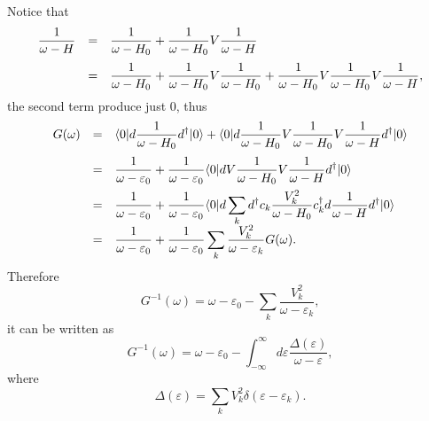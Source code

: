 \documentclass{book}
\newcommand{\bra}[1]{{\langle#1|}}
\newcommand{\ket}[1]{{|#1\rangle}}
\numberwithin{equation}{section}
\begin{document}
Notice that
\begin{equation}
  \begin{array}{rcl}
  \displaystyle\frac{1}{\omega-H}&=&\displaystyle\frac{1}{\omega-H_0}+
  \frac{1}{\omega-H_0}V\frac{1}{\omega-H}\\\vbox to 20pt{}
  &=&\displaystyle\frac{1}{\omega-H_0}+
  \frac{1}{\omega-H_0}V\frac{1}{\omega-H_0}+
  \frac{1}{\omega-H_0}V\frac{1}{\omega-H_0}V\frac{1}{\omega-H},
  \end{array}
\end{equation}
the second term produce just 0, thus 
\begin{equation}
  \begin{array}{rcl}
  G(\omega)&=&\displaystyle\bra{0}d\frac{1}{\omega-H_0}d^\dag\ket{0}+
  \bra{0}d\frac{1}{\omega-H_0}V\frac{1}{\omega-H_0}V
  \frac{1}{\omega-H}d^\dag\ket{0}\\\vbox to 20pt{}
  &=&\displaystyle\frac{1}{\omega-\varepsilon_0}+
  \frac{1}{\omega-\varepsilon_0}\bra{0}dV\frac{1}{\omega-H_0}V
  \frac{1}{\omega-H}d^\dag\ket{0}\\\vbox to 20pt{}
  &=&\displaystyle\frac{1}{\omega-\varepsilon_0}+
  \frac{1}{\omega-\varepsilon_0}
  \bra{0}d\sum_kd^\dag c_k\frac{V_k^2}{\omega-H_0}c_k^\dag d
  \frac{1}{\omega-H}d^\dag\ket{0}\\
  &=&\displaystyle\frac{1}{\omega-\varepsilon_0}+
  \frac{1}{\omega-\varepsilon_0}
  \sum_k\frac{V_k^2}{\omega-\varepsilon_k}G(\omega).
  \end{array}
\end{equation}
Therefore 
\begin{equation}
  G^{-1}(\omega)=\omega-\varepsilon_0-
  \sum_k\frac{V_k^2}{\omega-\varepsilon_k},
\end{equation}
it can be written as
\begin{equation}
  G^{-1}(\omega)=\omega-\varepsilon_0-\int_{-\infty}^\infty d\varepsilon
  \frac{\Delta(\varepsilon)}{\omega-\varepsilon},
\end{equation}
where
\begin{equation}
  \Delta(\varepsilon)=\sum_kV_k^2\delta(\varepsilon-\varepsilon_k).
\end{equation}
\end{document}

